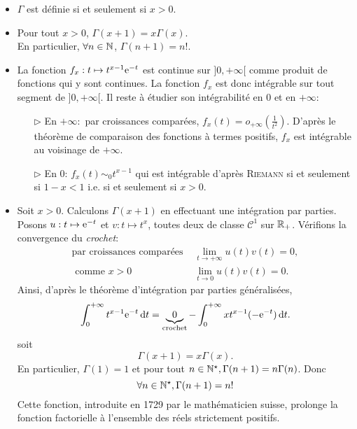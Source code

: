 \begin{prop}
    \begin{itemize}
        \item $\Gamma$ est définie si et seulement si $x>0$.
        \item Pour tout $x > 0$, $\Gamma(x+1) = x\Gamma(x)$. \\
        En particulier, $\forall n \in \mathbb{N}$, $\Gamma(n+1) = n!$. 
    \end{itemize}
\end{prop}

\begin{preuve}
    \begin{itemize}
        \item La fonction $f_x:t \mapsto t^{x-1} \mathrm{e}^{-t}$ est continue sur $]0, + \infty[$ comme produit de fonctions qui y sont continues. La fonction $f_x$ est donc intégrable sur tout segment de $]0, +\infty[$. Il reste à étudier son intégrabilité en $0$ et en $+ \infty$:
        \begin{itemize}
            \item[$\triangleright$] En $+\infty:$ par croissances comparées, $f_x(t) = o_{+\infty} \left(\frac{1}{t^2} \right)$. D'après le théorème de comparaison des fonctions à termes positifs, $f_x$ est intégrable au voisinage de $+\infty$.
            \item[$\triangleright$] En $0$: $f_x(t) \sim_0 t^{x-1}$ qui est intégrable d'après \textsc{Riemann} si et seulement si $1-x < 1$ i.e. si et seulement si $x > 0$.
        \end{itemize}

        \item Soit $x > 0$. Calculons $\Gamma(x+1)$ en effectuant une intégration par parties. Posons $u:t \mapsto \mathrm{e}^{-t}$ et $v:t \mapsto t^x$, toutes deux de classe $\mathscr{C}^1$ sur $\mathbb{R}_+$. Vérifions la convergence du \emph{crochet}:
        \begin{align*}
            \text{par croissances comparées } & \lim_{t \to +\infty} u(t) v(t) = 0, \\
            \text{ comme } x > 0 & \lim_{t \to 0} u(t) v(t) = 0.
        \end{align*}
        Ainsi, d'après le théorème d'intégration par parties généralisées, 
        $$\int_{0}^{+\infty} t^{x-1} \mathrm{e}^{-t} \, \mathrm{d} t = \underbrace{0}_{\text{crochet}} - \int_{0}^{+\infty} xt^{x-1} (-\mathrm{e}^{-t}) \, \mathrm{d} t.$$
        soit 
        $$\Gamma(x+1) = x \Gamma(x).$$
        En particulier, $\Gamma(1) = 1$ et pour tout $n \in \mathbb{N}^\star, \Gamma(n+1) = n \Gamma(n)$. Donc
        $$\forall n \in \mathbb{N}^\star, \Gamma(n+1) = n!$$
        Cette fonction, introduite en 1729 par le mathématicien suisse, prolonge la fonction factorielle à l'ensemble des réels strictement positifs.
    \end{itemize}
\end{preuve}

